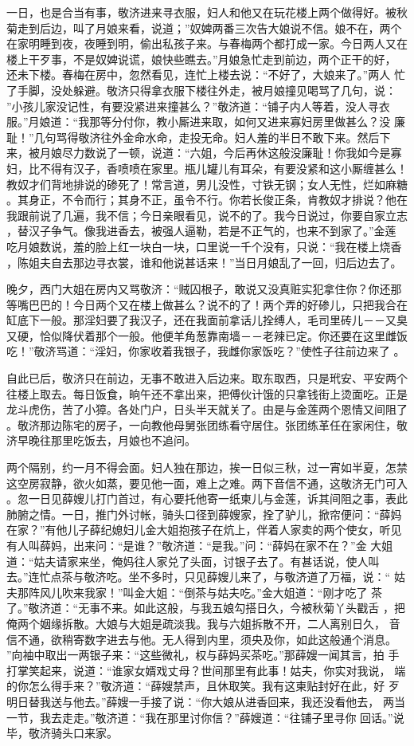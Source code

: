 一日，也是合当有事，敬济进来寻衣服，妇人和他又在玩花楼上两个做得好。被秋
菊走到后边，叫了月娘来看，说道；”奴婢两番三次告大娘说不信。娘不在，两个
在家明睡到夜，夜睡到明，偷出私孩子来。与春梅两个都打成一家。今日两人又在
楼上干歹事，不是奴婢说谎，娘快些瞧去。”月娘急忙走到前边，两个正干的好，
还未下楼。春梅在房中，忽然看见，连忙上楼去说：“不好了，大娘来了。”两人
忙了手脚，没处躲避。敬济只得拿衣服下楼往外走，被月娘撞见喝骂了几句，说：
”小孩儿家没记性，有要没紧进来撞甚么？”敬济道：“铺子内人等着，没人寻衣
服。”月娘道：“我那等分付你，教小厮进来取，如何又进来寡妇房里做甚么？没
廉耻！”几句骂得敬济往外金命水命，走投无命。妇人羞的半日不敢下来。然后下
来，被月娘尽力数说了一顿，说道：“六姐，今后再休这般没廉耻！你我如今是寡
妇，比不得有汉子，香喷喷在家里。瓶儿罐儿有耳朵，有要没紧和这小厮缠甚么！
教奴才们背地排说的碜死了！常言道，男儿没性，寸铁无钢；女人无性，烂如麻糖
。其身正，不令而行；其身不正，虽令不行。你若长俊正条，肯教奴才排说？他在
我跟前说了几遍，我不信；今日亲眼看见，说不的了。我今日说过，你要自家立志
，替汉子争气。像我进香去，被强人逼勒，若是不正气的，也来不到家了。”金莲
吃月娘数说，羞的脸上红一块白一块，口里说一千个没有，只说：“我在楼上烧香
，陈姐夫自去那边寻衣裳，谁和他说甚话来！”当日月娘乱了一回，归后边去了。

晚夕，西门大姐在房内又骂敬济：“贼囚根子，敢说又没真赃实犯拿住你？你还那
等嘴巴巴的！今日两个又在楼上做甚么？说不的了！两个弄的好碜儿，只把我合在
缸底下一般。那淫妇要了我汉子，还在我面前拿话儿拴缚人，毛司里砖儿－－又臭
又硬，恰似降伏着那个一般。他便羊角葱靠南墙－－老辣已定。你还要在这里雌饭
吃！”敬济骂道：“淫妇，你家收着我银子，我雌你家饭吃？”使性子往前边来了
。

自此已后，敬济只在前边，无事不敢进入后边来。取东取西，只是玳安、平安两个
往楼上取去。每日饭食，晌午还不拿出来，把傅伙计饿的只拿钱街上烫面吃。正是
龙斗虎伤，苦了小獐。各处门户，日头半天就关了。由是与金莲两个恩情又间阻了
。敬济那边陈宅的房子，一向教他母舅张团练看守居住。张团练革任在家闲住，敬
济早晚往那里吃饭去，月娘也不追问。

两个隔别，约一月不得会面。妇人独在那边，挨一日似三秋，过一宵如半夏，怎禁
这空房寂静，欲火如蒸，要见他一面，难上之难。两下音信不通，这敬济无门可入
。忽一日见薛嫂儿打门首过，有心要托他寄一纸柬儿与金莲，诉其间阻之事，表此
肺腑之情。一日，推门外讨帐，骑头口径到薛嫂家，拴了驴儿，掀帘便问：“薛妈
在家？”有他儿子薛纪媳妇儿金大姐抱孩子在炕上，伴着人家卖的两个使女，听见
有人叫薛妈，出来问：“是谁？”敬济道：“是我。”问：“薛妈在家不在？”金
大姐道：“姑夫请家来坐，俺妈往人家兑了头面，讨银子去了。有甚话说，使人叫
去。”连忙点茶与敬济吃。坐不多时，只见薛嫂儿来了，与敬济道了万福，说：“
姑夫那阵风儿吹来我家！”叫金大姐：“倒茶与姑夫吃。”金大姐道：“刚才吃了
茶了。”敬济道：“无事不来。如此这般，与我五娘勾搭日久，今被秋菊丫头戳舌
，把俺两个姻缘拆散。大娘与大姐是疏淡我。我与六姐拆散不开，二人离别日久，
音信不通，欲稍寄数字进去与他。无人得到内里，须央及你，如此这般通个消息。
”向袖中取出一两银子来：“这些微礼，权与薛妈买茶吃。”那薛嫂一闻其言，拍
手打掌笑起来，说道：“谁家女婿戏丈母？世间那里有此事！姑夫，你实对我说，
端的你怎么得手来？”敬济道：“薛嫂禁声，且休取笑。我有这柬贴封好在此，好
歹明日替我送与他去。”薛嫂一手接了说：“你大娘从进香回来，我还没看他去，
两当一节，我去走走。”敬济道：“我在那里讨你信？”薛嫂道：“往铺子里寻你
回话。”说毕，敬济骑头口来家。

